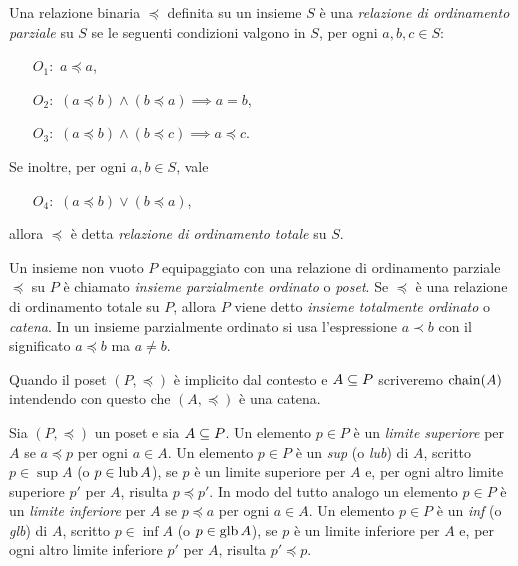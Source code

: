 \begin{definizione}  
Una relazione binaria $\preceq$ definita su un insieme
$S$ \`e una \emph{relazione di ordinamento parziale} su $S$
se le seguenti condizioni valgono in $S$,
per ogni $a, b, c \in S$:
\begin{itemize}
\item[$O_1:$] $a \preceq a$,
\item[$O_2:$] $(a \preceq b) \land (b \preceq a) \implies a = b$,
\item[$O_3:$] $(a \preceq b) \land (b \preceq c) \implies a \preceq c$.
\end{itemize}
Se inoltre, per ogni $a, b \in S$, vale
\begin{itemize}
\item[$O_4:$] $(a \preceq b) \lor (b \preceq a)$,
\end{itemize}
allora $\preceq$ \`e detta \emph{relazione di ordinamento totale} su $S$.
\end{definizione}

\begin{definizione} 
Un insieme non vuoto $P$ equipaggiato con una relazione di ordinamento
parziale $\preceq$ su $P$ \`e chiamato
\emph{insieme parzialmente ordinato} o \emph{poset}.
Se $\preceq$ \`e una relazione di
ordinamento totale su $P$, allora $P$ viene detto
\emph{insieme totalmente ordinato} o \emph{catena}.
In un insieme parzialmente
ordinato si usa l'espressione $a \prec b$ con il significato $a\preceq b$ ma
$a \neq b$.
\end{definizione}

Quando il poset $(P, \preceq)$ \`e implicito dal contesto
e $A \subseteq P$ scriveremo $\mathop{\mathrm{chain}}\nolimits(A)$ intendendo con questo
che $(A, \preceq)$ \`e una catena.

\begin{definizione} 
Sia $(P, \preceq)$ un poset e sia $A \subseteq P$.
Un elemento $p \in P$ \`e un \emph{limite superiore} per $A$
se $a \preceq p$ per ogni $a\in A$.
Un elemento $p \in P$ \`e un \emph{sup} (o \emph{lub}) di $A$,
scritto $p \in \sup A$ (o $p \in \mathop{\mathrm{lub}}\nolimits A$),
se $p$ \`e un limite superiore per $A$ e,
per ogni altro limite superiore $p'$ per $A$,
risulta $p \preceq p'$.
In modo del tutto analogo un elemento $p \in P$ \`e un \emph{limite inferiore}
per $A$ se $p \preceq a$ per ogni $a \in A$.
Un elemento $p \in P$ \`e un \emph{inf} (o \emph{glb}) di $A$,
scritto $p \in \inf A$ (o $p \in \mathop{\mathrm{glb}}\nolimits A$),
se $p$ \`e un limite inferiore per $A$ e,
per ogni altro limite inferiore $p'$ per $A$, risulta $p' \preceq p$.
\end{definizione}

